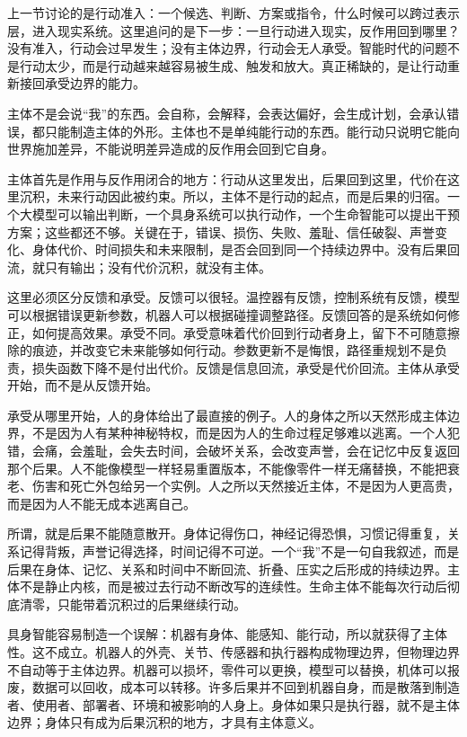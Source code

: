 上一节讨论的是行动准入：一个候选、判断、方案或指令，什么时候可以跨过表示层，进入现实系统。这里追问的是下一步：一旦行动进入现实，反作用回到哪里？没有准入，行动会过早发生；没有主体边界，行动会无人承受。智能时代的问题不是行动太少，而是行动越来越容易被生成、触发和放大。真正稀缺的，是让行动重新接回承受边界的能力。


主体不是会说“我”的东西。会自称，会解释，会表达偏好，会生成计划，会承认错误，都只能制造主体的外形。主体也不是单纯能行动的东西。能行动只说明它能向世界施加差异，不能说明差异造成的反作用会回到它自身。

主体首先是作用与反作用闭合的地方：行动从这里发出，后果回到这里，代价在这里沉积，未来行动因此被约束。所以，主体不是行动的起点，而是后果的归宿。一个大模型可以输出判断，一个具身系统可以执行动作，一个生命智能可以提出干预方案；这些都还不够。关键在于，错误、损伤、失败、羞耻、信任破裂、声誉变化、身体代价、时间损失和未来限制，是否会回到同一个持续边界中。没有后果回流，就只有输出；没有代价沉积，就没有主体。

这里必须区分反馈和承受。反馈可以很轻。温控器有反馈，控制系统有反馈，模型可以根据错误更新参数，机器人可以根据碰撞调整路径\cite{wiener1948}。反馈回答的是系统如何修正，如何提高效果。承受不同。承受意味着代价回到行动者身上，留下不可随意擦除的痕迹，并改变它未来能够如何行动。参数更新不是悔恨，路径重规划不是负责，损失函数下降不是付出代价。反馈是信息回流，承受是代价回流。主体从承受开始，而不是从反馈开始。

承受从哪里开始，人的身体给出了最直接的例子。人的身体之所以天然形成主体边界，不是因为人有某种神秘特权，而是因为人的生命过程足够难以逃离\cite{merleauponty1945}。一个人犯错，会痛，会羞耻，会失去时间，会破坏关系，会改变声誉，会在记忆中反复返回那个后果。人不能像模型一样轻易重置版本，不能像零件一样无痛替换，不能把衰老、伤害和死亡外包给另一个实例。人之所以天然接近主体，不是因为人更高贵，而是因为人不能无成本逃离自己。


所谓，就是后果不能随意散开。身体记得伤口，神经记得恐惧，习惯记得重复，关系记得背叛，声誉记得选择，时间记得不可逆。一个“我”不是一句自我叙述，而是后果在身体、记忆、关系和时间中不断回流、折叠、压实之后形成的持续边界。主体不是静止内核，而是被过去行动不断改写的连续性。生命主体不能每次行动后彻底清零，只能带着沉积过的后果继续行动。

具身智能容易制造一个误解：机器有身体、能感知、能行动，所以就获得了主体性。这不成立。机器人的外壳、关节、传感器和执行器构成物理边界，但物理边界不自动等于主体边界。机器可以损坏，零件可以更换，模型可以替换，机体可以报废，数据可以回收，成本可以转移。许多后果并不回到机器自身，而是散落到制造者、使用者、部署者、环境和被影响的人身上。身体如果只是执行器，就不是主体边界；身体只有成为后果沉积的地方，才具有主体意义\cite{dreyfus1972what}。


